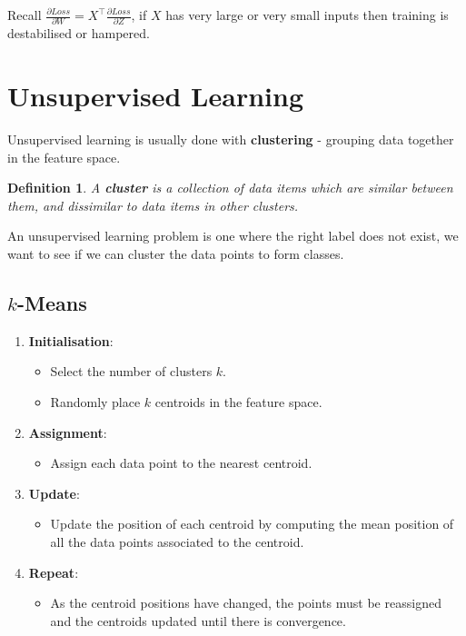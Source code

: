 \documentclass[11pt]{article}
\newtheorem{defn}{Definition}
\begin{document}
Recall $\frac{\partial Loss}{\partial W} = X^\intercal \frac{\partial Loss}{\partial Z}$, if $X$ has very large or very small inputs then training is destabilised or hampered.

\section{Unsupervised Learning}
Unsupervised learning is usually done with \textbf{clustering} - grouping data together in the feature space.
\begin{defn}
  A \textbf{cluster} is a collection of data items which are similar between them, and dissimilar to data items in other clusters.
\end{defn}
An unsupervised learning problem is one where the right label does not exist, we want to see if we can cluster the data points to form classes.

\subsection{$k$-Means}
\begin{enumerate}
  \item \textbf{Initialisation}:
    \begin{itemize}
      \item Select the number of clusters $k$.
      \item Randomly place $k$ centroids in the feature space.
    \end{itemize}
  \item \textbf{Assignment}:
    \begin{itemize}
      \item Assign each data point to the nearest centroid.
    \end{itemize}
  \item \textbf{Update}:
    \begin{itemize}
      \item Update the position of each centroid by computing the mean position of all the data points associated to the centroid.
    \end{itemize}
  \item \textbf{Repeat}:
    \begin{itemize}
      \item As the centroid positions have changed, the points must be reassigned and the centroids updated until there is convergence.
    \end{itemize}
\end{enumerate}
\end{document}
